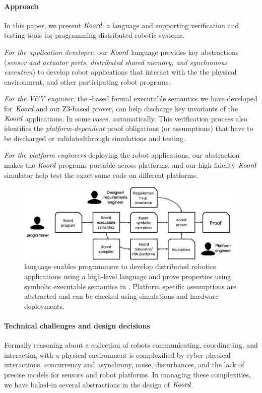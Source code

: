 \paragraph{Approach} In this paper, we present $\emph{Koord}$: a language and supporting verification and testing tools for programming distributed robotic systems. 
\begin{noinditem}
\item {\em For the application developer}, our $\emph{Koord}$ language provides key abstractions (\emph{sensor and actuator ports, distributed shared memory, and synchronous execution}) to develop robot applications that interact with the the physical environment, and other participating robot programs.
\item {\em For the V\&V engineer}, the \K-based formal executable semantics we have developed for $\emph{Koord}$ and our Z3-based prover, can help discharge key invariants of the $\emph{Koord}$ applications.  In some cases,  automatically. This verification process also identifies the {\em platform-dependent\/} proof obligations (or assumptions) that have to be discharged or validatedthrough simulations and testing. 
\item {\em For the platform engineers\/} deploying the robot applications, our abstraction makes the $\emph{Koord}$ programs portable across platforms, and our high-fidelity $\emph{Koord}$ simulator help test the exact same code on different platforms.
\end{noinditem}

\begin{figure}[h!]
\includegraphics[width=\linewidth]{figs/koorduser.png}
\caption{\small \lgname language  enables programmers to develop distributed robotics applications using a high-level language and prove properties using symbolic executable semantics in \K. Platform specific assumptions are abstracted and can be checked using simulations and hardware deployments.}
\label{fig:koorduser}
	\vspace{-5mm}
\end{figure}

\paragraph{Technical challenges and design decisions}
Formally reasoning about a collection of robots communicating, coordinating, and interacting with a physical environment is complexified by  cyber-physical interactions, concurrency and asynchrony, noise, disturbances, and the lack of precise models for sensors and robot platforms.
%
In managing these complexities, we have baked-in several abstractions in the design of $\emph{Koord}$.
%

